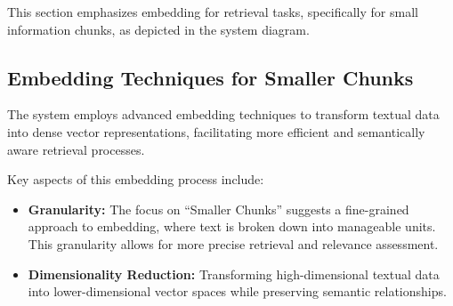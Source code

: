 This section emphasizes embedding for retrieval tasks, specifically for small information chunks, as depicted in the system diagram.

\subsection{Embedding Techniques for Smaller Chunks}\label{subsec:embedding-techniques-for-smaller-chunks}
The system employs advanced embedding techniques to transform textual data into dense vector representations, facilitating more efficient and semantically aware retrieval processes.

Key aspects of this embedding process include:
\begin{itemize}
    \item \textbf{Granularity:} The focus on ``Smaller Chunks'' suggests a fine-grained approach to embedding, where text is broken down into manageable units. This granularity allows for more precise retrieval and relevance assessment.
    \item \textbf{Dimensionality Reduction:} Transforming high-dimensional textual data into lower-dimensional vector spaces while preserving semantic relationships.
\end{itemize}

%
%

